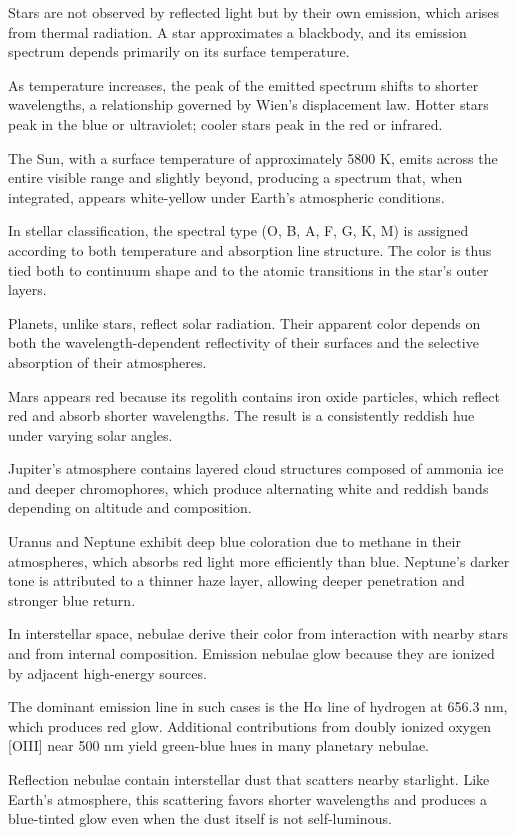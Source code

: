 Stars are not observed by reflected light but by their own emission, which arises from thermal radiation. A star approximates a blackbody, and its emission spectrum depends primarily on its surface temperature.

As temperature increases, the peak of the emitted spectrum shifts to shorter wavelengths, a relationship governed by Wien's displacement law. Hotter stars peak in the blue or ultraviolet; cooler stars peak in the red or infrared.

The Sun, with a surface temperature of approximately 5800 K, emits across the entire visible range and slightly beyond, producing a spectrum that, when integrated, appears white-yellow under Earth's atmospheric conditions.

In stellar classification, the spectral type (O, B, A, F, G, K, M) is assigned according to both temperature and absorption line structure. The color is thus tied both to continuum shape and to the atomic transitions in the star's outer layers.

Planets, unlike stars, reflect solar radiation. Their apparent color depends on both the wavelength-dependent reflectivity of their surfaces and the selective absorption of their atmospheres.

Mars appears red because its regolith contains iron oxide particles, which reflect red and absorb shorter wavelengths. The result is a consistently reddish hue under varying solar angles.

Jupiter's atmosphere contains layered cloud structures composed of ammonia ice and deeper chromophores, which produce alternating white and reddish bands depending on altitude and composition.

Uranus and Neptune exhibit deep blue coloration due to methane in their atmospheres, which absorbs red light more efficiently than blue. Neptune's darker tone is attributed to a thinner haze layer, allowing deeper penetration and stronger blue return.

In interstellar space, nebulae derive their color from interaction with nearby stars and from internal composition. Emission nebulae glow because they are ionized by adjacent high-energy sources.

The dominant emission line in such cases is the H$\alpha$ line of hydrogen at 656.3 nm, which produces red glow. Additional contributions from doubly ionized oxygen [OIII] near 500 nm yield green-blue hues in many planetary nebulae.

Reflection nebulae contain interstellar dust that scatters nearby starlight. Like Earth's atmosphere, this scattering favors shorter wavelengths and produces a blue-tinted glow even when the dust itself is not self-luminous.

